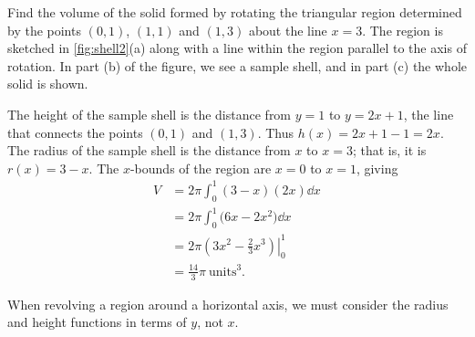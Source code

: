 \begin{example}\label{ex_shell2}%
Find the volume of the solid formed by rotating the triangular region determined by the points $(0,1)$, $(1,1)$ and $(1,3)$ about the line $x=3$.
\solution
The region is sketched in \autoref{fig:shell2}(a) along with a line within the region parallel to the axis of rotation. In part (b) of the figure, we see a sample shell, and in part (c) the whole solid is shown.

The height of the sample shell is the distance from $y=1$ to $y=2x+1$, the line that connects the points $(0,1)$ and $(1,3)$. Thus $h(x) = 2x+1-1 = 2x$. The radius of the sample shell is the distance from $x$ to $x=3$; that is, it is $r(x)=3-x$. The $x$-bounds of the region are $x=0$ to $x=1$, giving
\begin{align*}
	V
	&= 2\pi\int_0^1 (3-x)(2x)\dd x \\
	&= 2\pi\int_0^1 \bigl(6x-2x^2\bigr)\dd x \\
	&= 2\pi\left.\left(3x^2-\frac23x^3\right)\right|_0^1\\
	&= \frac{14}{3}\pi%
	\ \text{units}^3.
\end{align*}
\end{example}

When revolving a region around a horizontal axis, we must consider the radius and height functions in terms of $y$, not $x$.

